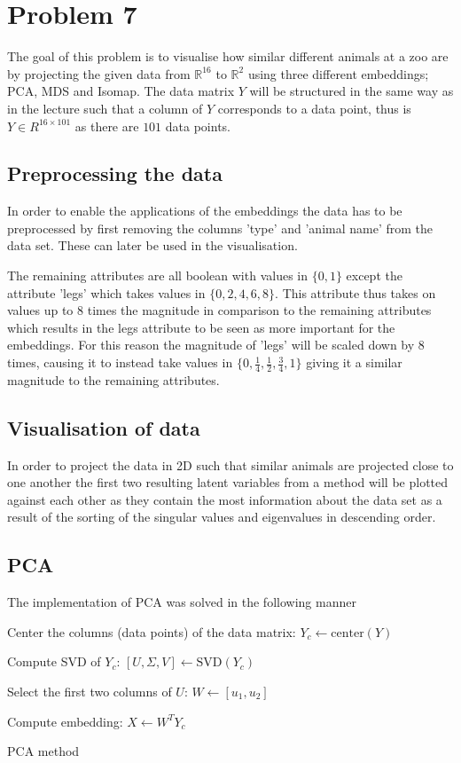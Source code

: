 \section*{Problem 7}
The goal of this problem is to visualise how similar different animals at a zoo are by projecting the given data from $\mathbb{R}^{16}$ to $\mathbb{R}^{2}$ using three different embeddings; PCA, MDS and Isomap. The data matrix $Y$ will be structured in the same way as in the lecture such that a column of $Y$ corresponds to a data point, thus is $Y \in R^{16 \times 101}$ as there are $101$ data points.

\subsection*{Preprocessing the data}
In order to enable the applications of the embeddings the data has to be preprocessed by first removing the columns 'type' and 'animal name' from the data set. These can later be used in the visualisation.

The remaining attributes are all boolean with values in $\{ 0,1 \}$ except the attribute 'legs' which takes values in $\{ 0, 2, 4, 6, 8 \}$. This attribute thus takes on values up to $8$ times the magnitude in comparison to the remaining attributes which results in the legs attribute to be seen as more important for the embeddings. For this reason the magnitude of 'legs' will be scaled down by $8$ times, causing it to instead take values in  $\{ 0, \frac{1}{4}, \frac{1}{2}, \frac{3}{4}, 1 \}$ giving it a similar magnitude to the remaining attributes.

\subsection*{Visualisation of data}
In order to project the data in 2D such that similar animals are projected close to one another the first two resulting latent variables from a method will be plotted against each other as they contain the most information about the data set as a result of the sorting of the singular values and eigenvalues in descending order.


\subsection*{PCA}
The implementation of PCA was solved in the following manner

\begin{algorithm}[H]
\SetAlgoLined
{}
 Center the columns (data points) of the data matrix: $Y_c \gets \text{center}(Y)$

 Compute SVD of $Y_c$: $[U,\Sigma, V] \gets \text{SVD}(Y_c)$

 Select the first two columns of $U$: $W \gets [u_1, u_2]$

Compute embedding: $X \gets W^T Y_c$
 \caption{PCA method}
\end{algorithm}


